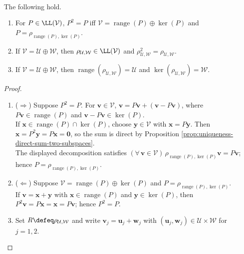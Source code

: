 \begin{proposition} \label{prop:algebraic-projection-range-kernel-idempotent} \\
The following hold.
\begin{enumerate}[label=(\roman*)]
\setlength{\itemsep}{0pt}
\item For $P\in\LL(\mathcal{V})$, $P^2=P$ iff $\mathcal{V}=\operatorname{range}(P)\oplus\ker(P)$ and $P=\rho_{\operatorname{range}(P),\ker(P)}$.
\item If $\mathcal{V}=\mathcal{U}\oplus\mathcal{W}$, then $\rho_{\mathcal{U},\mathcal{W}}\in\LL(\mathcal{V})$ and $\rho_{\mathcal{U},\mathcal{W}}^2=\rho_{\mathcal{U},\mathcal{W}}$.
\item If $\mathcal{V}=\mathcal{U}\oplus\mathcal{W}$, then $\operatorname{range}(\rho_{\mathcal{U},\mathcal{W}})=\mathcal{U}$ and $\ker(\rho_{\mathcal{U},\mathcal{W}})=\mathcal{W}$.
\end{enumerate}
\begin{proof}
\begin{enumerate}[label=(\roman*)]
\setlength{\itemsep}{0pt}
\item[$(i)$] ($\Rightarrow$) Suppose $P^2=P$. For $\mathbf{v}\in\mathcal{V}$, $\mathbf{v}=P\mathbf{v}+(\mathbf{v}-P\mathbf{v})$, where $P\mathbf{v}\in\operatorname{range}(P)$ and $\mathbf{v}-P\mathbf{v}\in\ker(P)$.\\
If $\mathbf{x}\in\operatorname{range}(P)\cap\ker(P)$, choose $\mathbf{y}\in\mathcal{V}$ with $\mathbf{x}=P\mathbf{y}$. Then $\mathbf{x}=P^2\mathbf{y}=P\mathbf{x}=\mathbf{0}$, so the sum is direct by Proposition \ref{prop:uniqueness-direct-sum-two-subspaces}.\\
The displayed decomposition satisfies $(\forall\,\mathbf{v}\in\mathcal{V})\,\rho_{\operatorname{range}(P),\ker(P)}\mathbf{v}=P\mathbf{v}$; hence $P=\rho_{\operatorname{range}(P),\ker(P)}$.
\item[$(i)$] ($\Leftarrow$) Suppose $\mathcal{V}=\operatorname{range}(P)\oplus\ker(P)$ and $P=\rho_{\operatorname{range}(P),\ker(P)}$.\\
If $\mathbf{v}=\mathbf{x}+\mathbf{y}$ with $\mathbf{x}\in\operatorname{range}(P)$ and $\mathbf{y}\in\ker(P)$, then $P^2\mathbf{v}=P\mathbf{x}=\mathbf{x}=P\mathbf{v}$; hence $P^2=P$.
\item[$(ii)$] Set $R\defeq\rho_{\mathcal{U},\mathcal{W}}$ and write $\mathbf{v}_j=\mathbf{u}_j+\mathbf{w}_j$ with $(\mathbf{u}_j,\mathbf{w}_j)\in\mathcal{U}\times\mathcal{W}$ for $j=1,2$.\\

\end{enumerate}
\end{proof}
\end{proposition}
